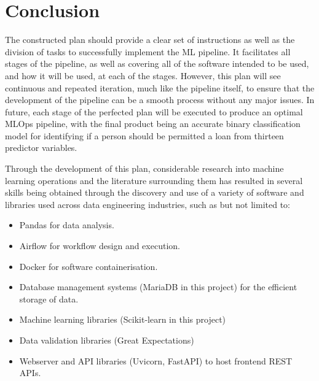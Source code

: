 \documentclass[12pt]{report}
\begin{document}
\chapter{Conclusion}
The constructed plan should provide a clear set of instructions as well as the division of tasks 
to successfully implement the ML pipeline. It facilitates all stages of the pipeline, as well as 
covering all of the software intended to be used, and how it will be used, at each of the stages.
However, this plan will see continuous and repeated iteration, much like the pipeline itself, to ensure 
that the development of the pipeline can be a smooth process without any major issues.
In future, each stage of the perfected plan will be executed to produce an optimal MLOps pipeline, with the final 
product being an accurate binary classification model for identifying if a person should be permitted a 
loan from thirteen predictor variables. 


Through the development of this plan, considerable research into machine learning operations and the literature 
surrounding them has resulted in several skills being obtained through the discovery and use of 
a variety of software and libraries used across data engineering industries, such as but not limited to:

\begin{itemize}
    \item Pandas for data analysis.
    \item Airflow for workflow design and execution.
    \item Docker for software containerisation.
    \item Database management systems (MariaDB in this project) for the efficient storage of data.
    \item Machine learning libraries (Scikit-learn in this project) 
    \item Data validation libraries (Great Expectations)
    \item Webserver and API libraries (Uvicorn, FastAPI) to host frontend REST APIs.
\end{itemize}






\printbibliography
\end{document}
